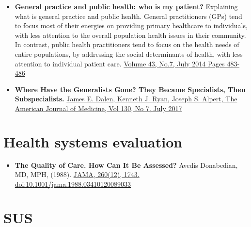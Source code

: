 \documentclass[]{book}
\providecommand{\tightlist}{%
  \setlength{\itemsep}{0pt}\setlength{\parskip}{0pt}}
\begin{document}
\begin{itemize}
\item
  \textbf{General practice and public health: who is my patient?} Explaining what is general practice and public health. General practitioners (GPs) tend to focus most of their energies on providing primary healthcare to individuals, with less attention to the overall population health issues in their community. In contrast, public health practitioners tend to focus on the health needs of entire populations, by addressing the social determinants of health, with less attention to individual patient care.
  \href{https://www.racgp.org.au/afp/2014/july/who-is-my-patient/}{Volume 43, No.7, July 2014 Pages 483-486}
\item
  \textbf{Where Have the Generalists Gone? They Became Specialists, Then Subspecialists.} \href{https://www.amjmed.com/article/S0002-9343\%2817\%2930134-1/pdf}{James E. Dalen, Kenneth J. Ryan, Joseph S. Alpert, The American Journal of Medicine, Vol 130, No 7, July 2017}
\end{itemize}

\hypertarget{health-systems-evaluation}{%
\section*{Health systems evaluation}\label{health-systems-evaluation}}

\begin{itemize}
\tightlist
\item
  \textbf{The Quality of Care. How Can It Be Assessed?} Avedis Donabedian, MD, MPH, (1988). \href{https://sci-hub.tw/10.1001/jama.1988.03410120089033}{JAMA, 260(12), 1743. doi:10.1001/jama.1988.03410120089033}
\end{itemize}

\hypertarget{sus}{%
\section*{SUS}\label{sus}}
\end{document}
